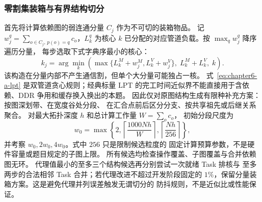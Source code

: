 \subsubsection{零割集装箱与有界结构切分}
首先将计算依赖图的弱连通分量 $C_j$ 作为不可切的装箱物品。
记 $w_j^q=\sum_{o\in C_j,\,p(o)=q}c_o$，$L_k^q$ 为核心 $k$
已分配的对应管道负载。按 $\max_q w_j^q$ 降序遍历分量，
每步选取下式字典序最小的核心：
\begin{equation}
k_j=\arg\min_{k}\left(
\max\{L_k^M+w_j^M,L_k^V+w_j^V\},\;
L_k^M+L_k^V,\;k\right).
\label{eq:chapter6-a-lpt}
\end{equation}
该构造在分量内部不产生通信割，但单个大分量可能独占一核。
式~\eqref{eq:chapter6-a-lpt} 是双管道贪心规则；经典标量 LPT
的完工时间近似界不能直接用于含依赖、DDR 争用和缓存换入换出的本题。
因此仅对原图结构生成有限种补充方案：按图深划带、在宽度谷处分段、
在汇合点前后区分分支、按共享祖先或后继关系聚合。
对最大拓扑深度 $h$ 和总计算工作量 $W=\sum_oc_o$，
初始分段尺度为
\begin{equation}
w_0=\max\left\{2,
\left\lceil\frac{1000Nh}{W}\right\rceil,
\left\lceil\frac{Nh}{256}\right\rceil\right\},
\label{eq:chapter6-a-width}
\end{equation}
并考察 $w_0,2w_0,4w_0$。式中 $256$ 只是限制候选粒度的
固定计算预算参数，不是硬件容量或题目规定的子图上限。
所有候选均检查操作覆盖、子图覆盖与合并依赖图无环。
代理值最小的至多三个结构候选再分别尝试一次就绪 Task 排核与
至多两步的合法相邻 Task 合并；若代理改进不超过开发阶段固定的
$1\%$，保留分量装箱方案。这是避免代理并列误差触发无谓切分的
防抖规则，不是近似比或性能保证。

\begin{center}
\centering
{}
\end{center}

